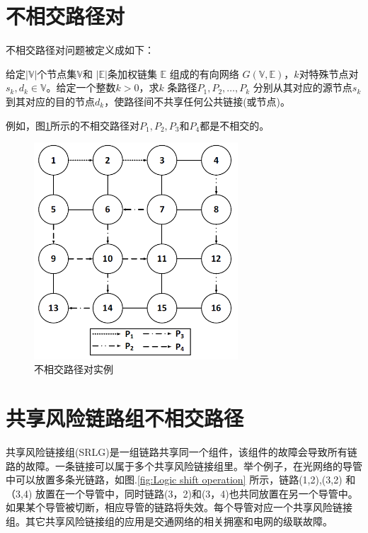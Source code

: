 \section{不相交路径对}
不相交路径对问题被定义成如下：

\begin{definition}[不相交路径对]
给定$|\mathbb{V}|$个节点集$\mathbb{V}$和 $|\mathbb{E}|$条加权链集 $\mathbb{E}$ 组成的有向网络 $G(\mathbb{V},\mathbb{E})$，$k$对特殊节点对$s_k,d_k\in\mathbb{V}$。给定一个整数$k>0$，求$k$ 条路径$P_1,P_2,\ldots,P_k$ 分别从其对应的源节点$s_k$到其对应的目的节点$d_k$，使路径间不共享任何公共链接(或节点)。
\end{definition}
例如，图\ref{fig:DisjointPathPairs}所示的不相交路径对$P_1,P_2,P_3$和$P_4$都是不相交的。
\begin{figure}[htbp]
  \centering
  \includegraphics[width=3.0in]{figures/DisjointPathPairs}
  \caption{不相交路径对实例}
  \label{fig:DisjointPathPairs}
\end{figure}
\section{共享风险链路组不相交路径}

共享风险链接组(SRLG)是一组链路共享同一个组件，该组件的故障会导致所有链路的故障。一条链接可以属于多个共享风险链接组里。举个例子，在光网络的导管中\cite{bhandari1994optimal}可以放置多条光链路，如图.\ref{fig:Logic shift operation} 所示，链路(1,2),(3,2) 和（3,4) 放置在一个导管中，同时链路(3，2)和(3，4)也共同放置在另一个导管中。如果某个导管被切断，相应导管的链路将失效。每个导管对应一个共享风险链接组。其它共享风险链接组的应用是交通网络的相关拥塞和电网的级联故障\cite{coudert2007shared}。


